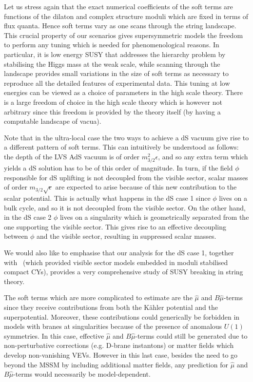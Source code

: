 \documentclass[11pt,a4paper]{article}
\begin{document}
Let us stress again that the exact numerical coefficients of the soft terms are functions of the dilaton and complex structure moduli which are fixed in terms of flux quanta. Hence soft terms vary as one scans through the string landscape. This crucial property of our scenarios gives supersymmetric models the freedom to perform any tuning which is needed for phenomenological reasons. In particular, it is low energy SUSY that addresses the hierarchy problem by stabilising the Higgs mass at the weak scale, while scanning through the landscape provides small variations in the size of soft terms as necessary to reproduce all the detailed features of experimental data. This tuning at low energies can be viewed as a choice of parameters in the high scale theory. There is a large freedom of choice in the high scale theory which is however not arbitrary since this freedom is provided by the theory itself (by having a computable landscape of vacua).

Note that in the ultra-local case the two ways to achieve a dS vacuum give rise to a different pattern of soft terms. This can intuitively be understood as follows: the depth of the LVS AdS vacuum is of order $m_{3/2}^2\epsilon$, and so any extra term which yields a dS solution has to be of this order of magnitude. In turn, if the field $\phi$ responsible for dS uplifting is not decoupled from the visible sector, scalar masses of order $m_{3/2} \sqrt{\epsilon}$ are expected to arise because of this new contribution to the scalar potential. This is actually what happens in the dS case 1 since $\phi$ lives on a bulk cycle, and so it is not decoupled from the visible sector. On the other hand, in the dS case 2 $\phi$ lives on a singularity which is geometrically separated from the one supporting the visible sector. This gives rise to an effective decoupling between $\phi$ and the visible sector, resulting in suppressed scalar masses.

We would also like to emphasise that our analysis for the dS case 1, together with~\cite{Cicoli:2012vw}
(which provided visible sector models embedded in moduli stabilised compact CYs),
provides a very comprehensive study of SUSY breaking in string theory.

The soft terms which are more complicated to estimate are the $\hat{\mu}$ and $B\hat{\mu}$-terms since they receive contributions from both the K\"ahler potential and the superpotential. Moreover, these contributions could generically be forbidden in models with branes at singularities because of the presence of anomalous $U(1)$ symmetries. In this case, effective $\hat{\mu}$ and $B\hat{\mu}$-terms could still be generated due to non-perturbative corrections (e.g. D-brane instantons) or matter fields which develop non-vanishing VEVs. However in this last case, besides the need to go beyond the MSSM by including additional matter fields, any prediction for $\hat{\mu}$ and $B\hat{\mu}$-terms would necessarily be model-dependent.
\end{document}
